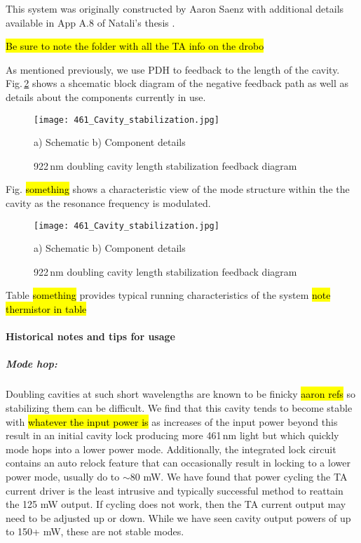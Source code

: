 This system was originally constructed by Aaron Saenz \cite{AaronDSaenz2005} with additional details available in App A.8 of Natali's thesis \cite{MartinezdeEscolar2010}.

\hl{Be sure to note the folder with all the TA info on the drobo}

As mentioned previously, we use PDH to feedback to the length of the cavity. 
Fig.\,\ref{fig:922cavityLock} shows a shcematic block diagram of the negative feedback path as well as details about the components currently in use.
	\begin{figure}
		\centerline{
		\texttt{[image: 461\_Cavity\_stabilization.jpg]}}
		\caption{922\,nm doubling cavity length stabilization feedback diagram}{a) Schematic b) Component details}
		\label{fig:922cavityLock}
	\end{figure}
	
Fig. \hl{something} shows a characteristic view of the mode structure within the the cavity as the resonance frequency is modulated.
	\begin{figure}
		\centerline{
		\texttt{[image: 461\_Cavity\_stabilization.jpg]}}
		\caption{922\,nm doubling cavity length stabilization feedback diagram}{a) Schematic b) Component details}
		\label{fig:922cavityLock}
	\end{figure}

Table \hl{something} provides typical running characteristics of the system \hl{note thermistor in table}

\paragraph{Historical notes and tips for usage}
\subparagraph{Mode hop:} 
Doubling cavities at such short wavelengths are known to be finicky \hl{aaron refs} so stabilizing them can be difficult. 
We find that this cavity tends to become stable with \hl{whatever the input power is} as increases of the input power beyond this result in an initial cavity lock producing more 461\,nm light but which quickly mode hops into a lower power mode.
Additionally, the integrated lock circuit contains an auto relock feature that can occasionally result in locking to a lower power mode, usually do to $\sim$80 mW.
We have found that power cycling the TA current driver is the least intrusive and typically successful method to reattain the 125 mW output.
If cycling does not work, then the TA current output may need to be adjusted up or down.
While we have seen cavity output powers of up to 150+ mW, these are not stable modes.

